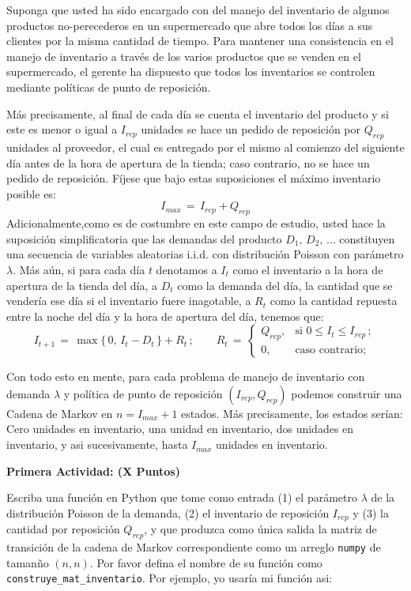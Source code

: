 \documentclass[ a4paper, twoside, 11pt]{article}
\begin{document}
\begin{problem}
Suponga que usted ha sido encargado con del manejo del inventario de algunos productos no-perecederos en un supermercado que abre todos los d\'ias a sus clientes por la misma cantidad de tiempo. Para mantener una consistencia en el manejo de inventario a trav\'es de los varios productos que se venden en el supermercado, el gerente ha dispuesto que todos los inventarios se controlen mediante pol\'iticas de punto de reposici\'on. 

M\'as precisamente, al final de cada d\'ia se cuenta el inventario del producto y si este es menor o igual a $I_{rep}$ unidades se hace un pedido de reposici\'on por $Q_{rep}$ unidades al proveedor, el cual es entregado por el mismo al comienzo del siguiente d\'ia antes de la hora de apertura de la tienda; caso contrario, no se hace un pedido de reposici\'on. F\'ijese que bajo estas suposiciones el m\'aximo inventario posible es:
\[
I_{max} \, = \, I_{rep} + Q_{rep}
\]
Adicionalmente,como es de costumbre en este campo de estudio, usted hace la suposici\'on simplificatoria que las demandas del producto $D_1, \, D_2, \, \dots$ constituyen una secuencia de variables aleatorias i.i.d. con distribuci\'on Poisson con par\'ametro $\lambda$. M\'as a\'un, si para cada d\'ia $t$ denotamos a $I_t$ como el inventario a la hora de apertura de la tienda del \tavo d\'ia, a $D_t$ como la demanda del d\'ia, \ie la cantidad que se vender\'ia ese d\'ia si el inventario fuere inagotable, a $R_t$ como la cantidad repuesta entre la noche del \tavo d\'ia y la hora de apertura del \tMavo d\'ia, tenemos que:
\[
I_{t+1} \, = \, \max \{ \, 0, \, I_t - D_t \, \} + R_t \, ; \qquad
R_t \, = \, 
\begin{cases}
Q_{rep}, & \text{si } 0 \leq I_t \leq I_{rep} \, ; \\
0, & \text{caso contrario;}
\end{cases}
\]

Con todo esto en mente, para cada problema de manejo de inventario con demanda $\lambda$ y pol\'itica de punto de reposici\'on $(I_{rep},Q_{rep})$ podemos construir una Cadena de Markov en $n = I_{max} + 1$ estados. M\'as precisamente, los estados ser\'ian: Cero unidades en inventario, una unidad en inventario, dos unidades en inventario, y asi sucesivamente, hasta $I_{max}$ unidades en inventario. 

\textbf{Primera Actividad: (X Puntos)}

Escriba una funci\'on en Python que tome como entrada (1) el par\'ametro $\lambda$ de la distribuci\'on Poisson de la demanda, (2) el inventario de reposici\'on $I_{rep}$ y (3) la cantidad por reposici\'on $Q_{rep}$, y que produzca como \'unica salida la matriz de transici\'on de la cadena de Markov correspondiente como un arreglo {\tt numpy} de taman\~no $(n,n)$. Por favor defina el nombre de su funci\'on como {\tt construye\_mat\_inventario}. Por ejemplo, yo usar\'ia mi funci\'on asi:
\halfskip


\end{problem}
\end{document}

